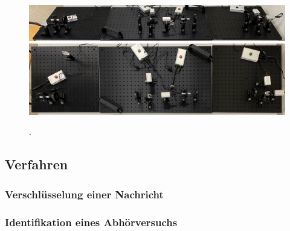 \begin{figure}[H]
	\centering
	\includegraphics[width=1.0\textwidth]{content/aufbau/front.jpg}\\[1ex]
	\includegraphics[width=1.0\textwidth]{content/aufbau/drauf.jpg}
	\caption{.}
	\label{fig:aufbau}
\end{figure}



\subsection{Verfahren}



\subsubsection{Verschlüsselung einer Nachricht}



\subsubsection{Identifikation eines Abhörversuchs}
